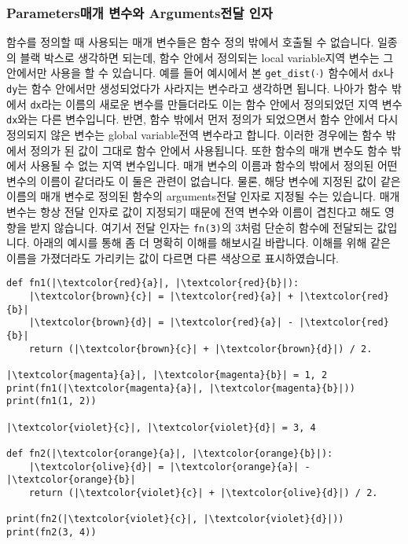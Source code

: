 \documentclass[../main.tex]{subfiles}
\begin{document}
\subsubsection{Parameters매개 변수와 Arguments전달 인자}
함수를 정의할 때 사용되는 매개 변수들은 함수 정의 밖에서 호출될 수 없습니다.
일종의 블랙 박스로 생각하면 되는데, 함수 안에서 정의되는 local variable지역
변수는 그 안에서만 사용을 할 수 있습니다.  예를 들어 예시에서 본
\texttt{get\_dist($\cdot$)} 함수에서 \texttt{dx}나 \texttt{dy}는 함수 안에서만
생성되었다가 사라지는 변수라고 생각하면 됩니다.  나아가 함수 밖에서
\texttt{dx}라는 이름의 새로운 변수를 만들더라도 이는 함수 안에서 정의되었던
지역 변수 \texttt{dx}와는 다른 변수입니다.  반면, 함수 밖에서 먼저 정의가
되었으면서 함수 안에서 다시 정의되지 않은 변수는 global variable전역 변수라고
합니다.  이러한 경우에는 함수 밖에서 정의가 된 값이 그대로 함수 안에서
사용됩니다.  또한 함수의 매개 변수도 함수 밖에서 사용될 수 없는 지역
변수입니다.  매개 변수의 이름과 함수의 밖에서 정의된 어떤 변수의 이름이
같더라도 이 둘은 관련이 없습니다.  물론, 해당 변수에 지정된 값이 같은 이름의
매개 변수로 정의된 함수의 arguments전달 인자로 지정될 수는 있습니다.  매개
변수는 항상 전달 인자로 값이 지정되기 때문에 전역 변수와 이름이 겹친다고 해도
영향을 받지 않습니다.  여기서 전달 인자는 \texttt{fn(3)}의 3처럼 단순히 함수에
전달되는 값입니다.  아래의 예시를 통해 좀 더 명확히 이해를 해보시길 바랍니다.
이해를 위해 같은 이름을 가졌더라도 가리키는 값이 다르면 다른 색상으로
표시하였습니다.
\begin{verbatim}
def fn1(|\textcolor{red}{a}|, |\textcolor{red}{b}|):
    |\textcolor{brown}{c}| = |\textcolor{red}{a}| + |\textcolor{red}{b}|
    |\textcolor{brown}{d}| = |\textcolor{red}{a}| - |\textcolor{red}{b}|
    return (|\textcolor{brown}{c}| + |\textcolor{brown}{d}|) / 2.

|\textcolor{magenta}{a}|, |\textcolor{magenta}{b}| = 1, 2
print(fn1(|\textcolor{magenta}{a}|, |\textcolor{magenta}{b}|))
print(fn1(1, 2))

|\textcolor{violet}{c}|, |\textcolor{violet}{d}| = 3, 4

def fn2(|\textcolor{orange}{a}|, |\textcolor{orange}{b}|):
    |\textcolor{olive}{d}| = |\textcolor{orange}{a}| - |\textcolor{orange}{b}|
    return (|\textcolor{violet}{c}| + |\textcolor{olive}{d}|) / 2.

print(fn2(|\textcolor{violet}{c}|, |\textcolor{violet}{d}|))
print(fn2(3, 4))
\end{verbatim}
\end{document}
